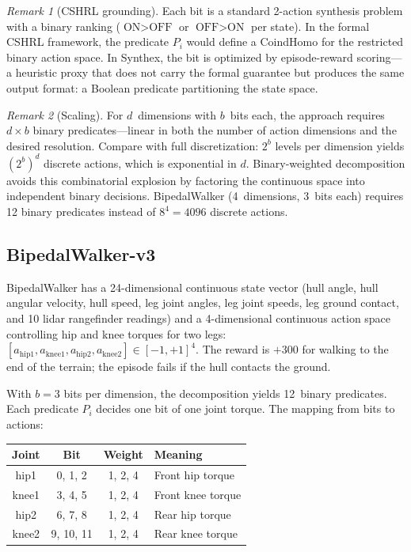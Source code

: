 \documentclass[9pt,a4paper]{article}
\theoremstyle{plain}
\theoremstyle{definition}
\theoremstyle{remark}
\newtheorem{remark}{Remark}
\begin{document}
\begin{remark}[CSHRL grounding]
Each bit is a standard 2-action synthesis problem with a
binary ranking ($\text{ON} > \text{OFF}$ or $\text{OFF} > \text{ON}$
per state).  In the formal CSHRL framework, the predicate
$P_i$ would define a CoindHomo for the restricted binary
action space.  In Synthex, the bit is optimized by
episode-reward scoring---a heuristic proxy that does not
carry the formal guarantee but produces the same output
format: a Boolean predicate partitioning the state space.
\end{remark}

\begin{remark}[Scaling]
For $d$~dimensions with $b$~bits each, the approach requires
$d \times b$ binary predicates---linear in both the number of
action dimensions and the desired resolution.  Compare with
full discretization: $2^b$ levels per dimension yields
$(2^b)^d$ discrete actions, which is exponential in $d$.
Binary-weighted decomposition avoids this combinatorial explosion
by factoring the continuous space into independent binary decisions.
BipedalWalker (4~dimensions, 3~bits each) requires 12 binary
predicates instead of $8^4 = 4096$ discrete actions.
\end{remark}

\subsection{BipedalWalker-v3}

BipedalWalker has a 24-dimensional continuous state vector
(hull angle, hull angular velocity, hull speed, leg joint angles,
leg joint speeds, leg ground contact, and 10 lidar rangefinder
readings) and a 4-dimensional continuous action space controlling
hip and knee torques for two legs: $[a_{\text{hip1}},
a_{\text{knee1}}, a_{\text{hip2}}, a_{\text{knee2}}] \in [-1, +1]^4$.
The reward is $+300$ for walking to the end of the terrain; the
episode fails if the hull contacts the ground.

With $b = 3$ bits per dimension, the decomposition yields
12~binary predicates.  Each predicate $P_i$ decides one bit of one
joint torque.  The mapping from bits to actions:
\begin{center}
\small
\begin{tabular}{cccl}
\toprule
\textbf{Joint} & \textbf{Bit} & \textbf{Weight} & \textbf{Meaning} \\
\midrule
hip1  & 0, 1, 2  & 1, 2, 4 & Front hip torque \\
knee1 & 3, 4, 5  & 1, 2, 4 & Front knee torque \\
hip2  & 6, 7, 8  & 1, 2, 4 & Rear hip torque \\
knee2 & 9, 10, 11 & 1, 2, 4 & Rear knee torque \\
\bottomrule
\end{tabular}
\end{center}
\end{document}
